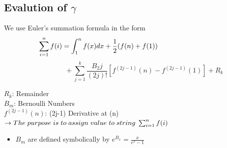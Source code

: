 \documentclass{article}
\def\to{\rightarrow}
\begin{document}
\begin{multicols}{3}
            \vspace{-0.3cm}
		\section*{Evalution of $\gamma$}
            \vspace{-0.3cm}
		\Large We use Euler's summation formula in the form
		\begin{equation*}
			\hspace{-3cm} \sum_{i=1}^{n} f(i) = \int_{1}^{n} f(x)dx + \frac{1}{2}(f(n)+f(1))
		\end{equation*}
		\begin{equation*}
			\hspace{2cm}+\sum_{j=1}^{k} \frac{B_2j}{(2j)!} [f^{(2j-1)}(n)-f^{(2j-1)}(1)]  + R_k
		\end{equation*}
		
		\noindent
		\colorbox{marronrp3}{
			\begin{minipage}[t]{.96\linewidth}
				\vspace{.2cm}
				\vspace{.05cm}
				$R_k$: Remainder\\
				$B_m$: Bernoulli\hspace{0.1cm} Numbers\\
				$f^{(2j-1)}(n)$: (2j-1) \hspace{0.1cm}Derivative\hspace{0.1cm} at \hspace{0.1cm} (n)\\
				$\to The \hspace{0.1cm} purpose\hspace{0.1cm} is\hspace{0.1cm} to\hspace{0.1cm} assign\hspace{0.1cm}value\hspace{0.1cm} to\hspace{0.1cm} string\hspace{0.1cm} \sum_{i=1}^{n} f(i)$
				\hspace{.05cm}\
			\end{minipage}
		}
		\noindent
		\begin{minipage}[t]{.96\linewidth}
			\vspace{.3cm}
			\begin{itemize}
				\Large\item  $B_m$ are defined symbolically by $e^{B_x} = \frac{x}{e^x-1}$
			\end{itemize} \\
		\end{minipage}
		

\end{multicols}
\end{document}
